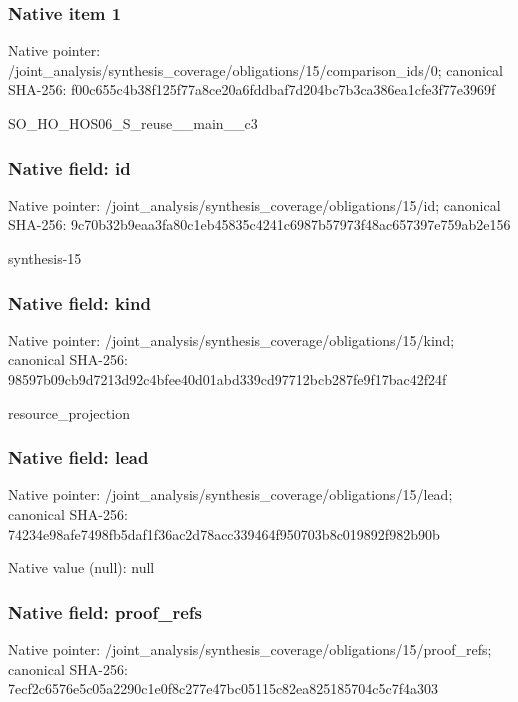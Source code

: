 \documentclass[10pt,a4paper]{article}
\begin{document}
\subsubsection{Native item 1}
Native pointer: /joint\_\allowbreak{}analysis/synthesis\_\allowbreak{}coverage/obligations/15/comparison\_\allowbreak{}ids/0; canonical SHA-256: f00c655c4b38f125f77a8ce20a6fddbaf7d204bc7b3ca386ea1cfe3f77e3969f

\begingroup\raggedright\sloppy SO\_\allowbreak{}HO\_\allowbreak{}HOS06\_\allowbreak{}S\_\allowbreak{}reuse\_\allowbreak{}\_\allowbreak{}main\_\allowbreak{}\_\allowbreak{}c3\par\endgroup

\subsubsection{Native field: id}
Native pointer: /joint\_\allowbreak{}analysis/synthesis\_\allowbreak{}coverage/obligations/15/id; canonical SHA-256: 9c70b32b9eaa3fa80c1eb45835c4241c6987b57973f48ac657397e759ab2e156

\begingroup\raggedright\sloppy synthesis-15\par\endgroup

\subsubsection{Native field: kind}
Native pointer: /joint\_\allowbreak{}analysis/synthesis\_\allowbreak{}coverage/obligations/15/kind; canonical SHA-256: 98597b09cb9d7213d92c4bfee40d01abd339cd97712bcb287fe9f17bac42f24f

\begingroup\raggedright\sloppy resource\_\allowbreak{}projection\par\endgroup

\subsubsection{Native field: lead}
Native pointer: /joint\_\allowbreak{}analysis/synthesis\_\allowbreak{}coverage/obligations/15/lead; canonical SHA-256: 74234e98afe7498fb5daf1f36ac2d78acc339464f950703b8c019892f982b90b

Native value (null): null

\subsubsection{Native field: proof\_\allowbreak{}refs}
Native pointer: /joint\_\allowbreak{}analysis/synthesis\_\allowbreak{}coverage/obligations/15/proof\_\allowbreak{}refs; canonical SHA-256: 7ecf2c6576e5c05a2290c1e0f8c277e47bc05115c82ea825185704c5c7f4a303
\end{document}
